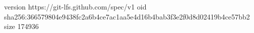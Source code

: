 version https://git-lfs.github.com/spec/v1
oid sha256:366579804e9438fc2a6b4ce7ac1aa5e4d16b4bab3f3e2f0d8d02419b4ce57bb2
size 174936
